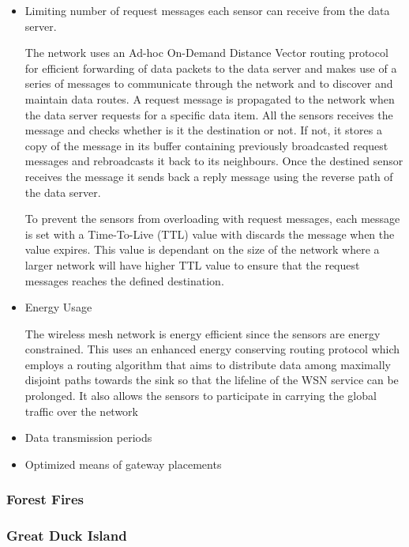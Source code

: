 \begin{itemize}
\item Limiting number of request messages each sensor can receive from the data server.

The network uses an Ad-hoc On-Demand Distance Vector routing protocol for efficient forwarding of data packets to the data server and makes use of a series of messages to communicate through the network and to discover and maintain data routes. A request message is propagated to the network when the data server requests for a specific data item. All the sensors receives the message and checks whether is it the destination or not. If not, it stores a copy of the message in its buffer containing previously broadcasted request messages and rebroadcasts it back to its neighbours. Once the destined sensor receives the message it sends back a reply message using the reverse path of the data server.

To prevent the sensors from overloading with request messages, each message is set with a Time-To-Live (TTL) value with discards the message when the value expires. This value is dependant on the size of the network where a larger network will have higher TTL value to ensure that the request messages reaches the defined destination.

\item Energy Usage

The wireless mesh network is energy efficient since the sensors are energy constrained. This uses an enhanced energy conserving routing protocol which employs a routing algorithm that aims to distribute data among maximally disjoint paths towards the sink so that the lifeline of the WSN service can be prolonged. It also allows the sensors to participate in carrying the global traffic over the network

\item Data transmission periods
\item Optimized means of gateway placements
\end{itemize}

\subsubsection{Forest Fires}
\cite{libeliumForestFires}
\cite{FireWxNet}

\subsubsection{Great Duck Island}
\cite{SzewczykPMC04}

